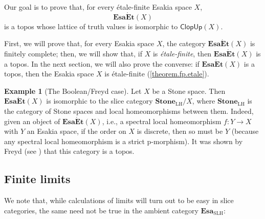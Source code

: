 \documentclass[12pt]{amsart}
\theoremstyle{plain}
\theoremstyle{definition}
\newtheorem{example}[theorem]{Example}
\newcommand{\cat}[1]{\mathbf{#1}}
\newcommand{\Esa}{\cat{Esa}}
\newcommand{\SLH}{\mathrm{SLH}}
\newcommand{\ClopUp}{\mathsf{ClopUp}}
\newcommand{\EsaEt}{\cat{Esa\acute{E}t}}
\begin{document}
Our goal is to prove that, for every étale-finite Esakia space $X$, 
\[
\EsaEt(X)
\]
is a topos whose lattice of truth values is isomorphic to $\ClopUp(X)$. 

First, we will prove that, for every Esakia space $X$, the category $\EsaEt(X)$ is finitely complete; then, we will show that, if $X$ is \emph{étale-finite}, then $\EsaEt(X)$ is a topos.
In the next section, we will also prove the converse: if $\EsaEt(X)$ is a topos, then the Esakia space $X$ is étale-finite (\cref{theorem.fp.etale}).

\begin{example}[The Boolean/Freyd case]
    Let $X$ be a Stone space. Then $\EsaEt(X)$ is isomorphic to the slice category $\cat{Stone}_{\mathrm{LH}}/X$, where $\cat{Stone}_{\mathrm{LH}}$ is the category of Stone spaces and local homeomorphisms between them. Indeed, given an object of $\EsaEt(X)$, i.e., a spectral local homeomorphism $f\colon Y\to X$ with $Y$ an Esakia space, if the order on $X$ is discrete, then so must be $Y$ (because any spectral local homeomorphism is a strict p-morphism). It was shown by Freyd (see \cite[Exercise~9.11]{johnstonetopos}) that this category is a topos.
\end{example}


\subsection{Finite limits}

We note that, while calculations of limits will turn out to be easy in slice categories, the same need not be true in the ambient category $\Esa_{\SLH}$:
\end{document}
